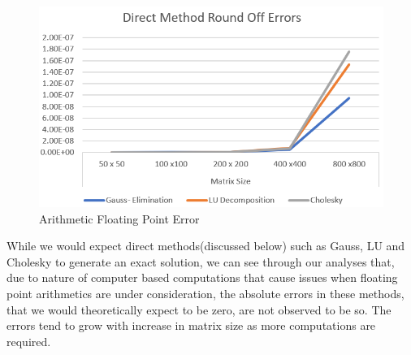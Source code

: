\documentclass[twoside,twocolumn]{article}
\begin{document}
\begin{figure}[H]
    \centering
    \includegraphics[width=\linewidth]{direct method round off errors}
    \caption{Arithmetic Floating Point Error }
    \label{fig:my_label}
\end{figure}
While we would expect direct methods(discussed below) such as Gauss, LU and Cholesky to generate an exact solution, we can see through our analyses that, due to nature of computer based computations that cause issues when floating point arithmetics are under consideration, the absolute errors in these methods, that we would theoretically expect to be zero, are not observed to be so. The errors tend to grow with increase in matrix size as more computations are required. 
\end{document}
